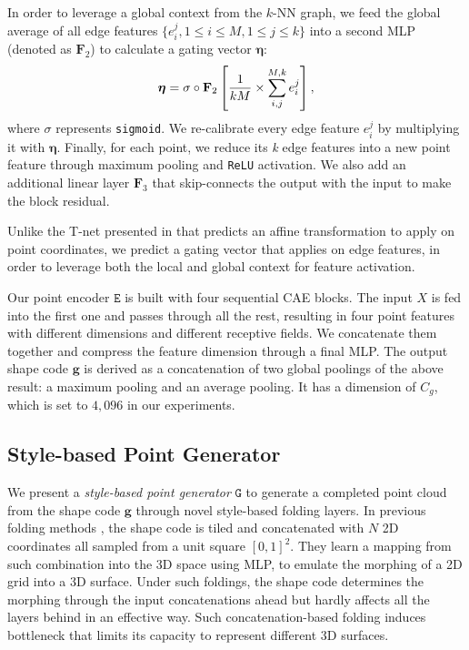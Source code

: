 \documentclass[final]{cvpr}
\begin{document}
In order to leverage a global context from the $k$-NN graph, we feed the global average of all edge features $\{e_i^j, 1{\leq}i{\leq}M, 1{\leq}j{\leq}k\}$ into a second MLP (denoted as $\mathbf{F}_2$) to calculate a gating vector $\bm{\eta}$:
\vspace{-0.5em}
\begin{equation}
\vspace{-0.5em}
\bm{\eta} = \sigma \circ \mathbf{F}_2 \left[ \frac{1}{kM} \times \sum_{i,j}^{M,k} e_i^j \right],
\label{equ:eta}
\end{equation}
where $\sigma$ represents \texttt{sigmoid}.
We re-calibrate every edge feature $e_i^j$ by multiplying it with $\bm{\eta}$.
Finally, for each point, we reduce its \emph{k} edge features into a new point feature through maximum pooling and \texttt{ReLU} activation.
We also add an additional linear layer $\mathbf{F}_3$ that skip-connects the output with the input to make the block residual.

Unlike the T-net presented in \cite{qi2017pointnet} that predicts an affine transformation to apply on point coordinates,
we predict a gating vector that applies on edge features, in order to leverage both the local and global context for feature activation.

Our point encoder $\mathtt{E}$ is built with four sequential CAE blocks. The input $X$ is fed into the first one and passes through all the rest, resulting in four point features with different dimensions and different receptive fields. We concatenate them together and compress the feature dimension through a final MLP. The output shape code $\mathbf{g}$ is derived as a concatenation of two global poolings of the above result: a maximum pooling and an average pooling. It has a dimension of $C_g$, which is set to $4,096$ in our experiments.





\subsection{Style-based Point Generator} 
\label{ssec:generator}


We present a \emph{style-based point generator} $\mathtt{G}$ to generate a completed point cloud from the shape code $\mathbf{g}$ through novel style-based folding layers.
In previous folding methods \cite{foldingnet_2018_CVPR,Yuan-2018-pcn,atlasnet2018,liu2019morphing}, the shape code is tiled and concatenated with $N$ 2D coordinates all sampled from a unit square $[0, 1]^2$. They learn a mapping from such combination into the 3D space using MLP, to emulate the morphing of a 2D grid into a 3D surface. Under such foldings, the shape code determines the morphing through the input concatenations ahead but hardly affects all the layers behind in an effective way. Such concatenation-based folding induces bottleneck that limits its capacity to represent different 3D surfaces.
\end{document}
